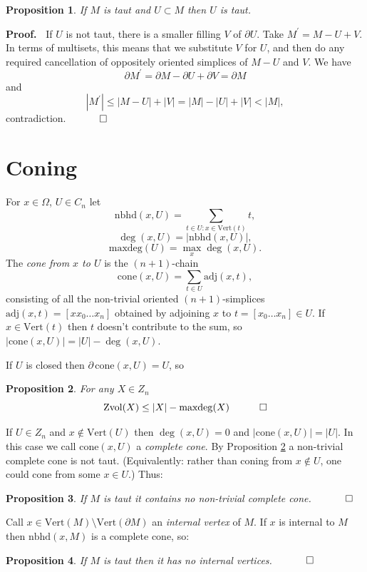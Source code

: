 \documentclass[12pt]{article}
\newtheorem{prop}{Proposition}
\newcommand{\proofstart}{{\noindent \bf Proof.\ }}
\newcommand{\mathproofend}{\quad \qed}
\newcommand{\proofend}{$\quad \qed$}
\def\del{\partial}
\newcommand{\kw}{\mathrm}
\newcommand{\cone}{\kw{cone}}
\newcommand{\maxdeg}{\kw{maxdeg}}
\newcommand{\vertices}{\kw{Vert}}
\newcommand{\nbhd}{\kw{nbhd}}
\newcommand{\adj}{\kw{adj}}
\newcommand{\Zvol}{\kw{Zvol}}
\begin{document}
\begin{prop} \label{subtaut}
If $M$ is taut and $U \subset M$ then $U$ is taut.
\end{prop}

\proofstart
If $U$ is not taut, there is a smaller filling $V$ of $\del U$.
Take $M^\prime = M-U+V$.
In terms of multisets, this means that we substitute $V$ for $U$,
and then do any required cancellation of oppositely oriented simplices
of $M-U$ and $V$.
We have
\[
\del M^\prime = \del M - \del U + \del V = \del M
\]
and
\[
|M^\prime| \leq |M-U| + |V| = |M| - |U| + |V| < |M|
,
\]
contradiction.
\proofend

\section{Coning}
For $x \in \Omega$, $U \in C_n$ let
\[
\nbhd(x,U) = \sum_{ t \in U: x \in \vertices(t) } t
,
\]
\[
\deg(x,U) = |\nbhd(x,U)|
,
\]
\[
\maxdeg(U) = \max_x \deg(x,U)
.
\]
The \emph{cone from $x$ to $U$}
is the $(n+1)$-chain
\[
\cone(x,U) = 
\sum_{t \in U} \adj(x,t)
,
\]
consisting of all the non-trivial oriented
$(n+1)$-simplices $\adj(x,t)=[x x_0\ldots x_n]$ obtained
by adjoining $x$ to  $t = [x_0\ldots x_n] \in U$.
If $x \in \vertices(t)$ then $t$ doesn't contribute to the sum,
so $|\cone(x,U)| = |U| - \deg(x,U)$.

If $U$ is closed then
$\del\, \cone(x,U) = U$, so

\begin{prop} \label{maxdeg}
For any $X \in Z_n$
\[
\Zvol(X) \leq |X| - \maxdeg(X)
\mathproofend
\]
\end{prop}

If $U \in Z_n$ and $x \notin \vertices(U)$ then
$\deg(x,U)=0$ and
$|\cone(x,U)| = |U|$.
In this case we call $\cone(x,U)$ a \emph{complete cone}.
By Proposition \ref{maxdeg} a non-trivial complete cone is not taut.
(Equivalently: rather than coning from $x \notin U$, one could cone from
some $x \in U$.)
Thus:
\begin{prop}\label{nocone}
If $M$ is taut it contains no non-trivial complete cone.
\proofend
\end{prop}

Call $x \in \vertices(M) \setminus \vertices(\del M)$ an
\emph{internal vertex} of $M$.
If $x$ is internal to $M$ then $\nbhd(x,M)$ is a complete cone, so:
\begin{prop} \label{nointernal}
If $M$ is taut then
it has no internal vertices.
\proofend
\end{prop}
\end{document}
